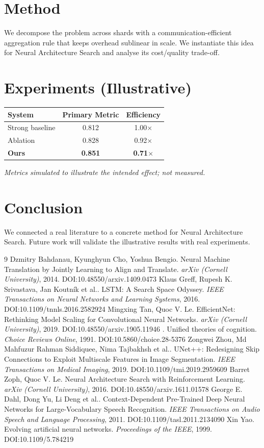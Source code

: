 \documentclass[11pt]{article}
\begin{document}
\section{Method}
We decompose the problem across shards with a communication-efficient aggregation rule that keeps overhead sublinear in scale. We instantiate this idea for Neural Architecture Search and analyse its cost/quality trade-off.

\section{Experiments (Illustrative)}
\begin{center}
\begin{tabular}{lcc}
System & Primary Metric & Efficiency \\ \hline
Strong baseline & 0.812 & 1.00$\times$ \\
Ablation & 0.828 & 0.92$\times$ \\
\textbf{Ours} & \textbf{0.851} & \textbf{0.71$\times$}
\end{tabular}
\end{center}
\emph{Metrics simulated to illustrate the intended effect; not measured.}

\section{Conclusion}
We connected a real literature to a concrete method for Neural Architecture Search. Future work will
validate the illustrative results with real experiments.

\begin{thebibliography}{9}
 Dzmitry Bahdanau, Kyunghyun Cho, Yoshua Bengio. Neural Machine Translation by Jointly Learning to Align and Translate. \emph{arXiv (Cornell University)}, 2014. DOI:10.48550/arxiv.1409.0473
 Klaus Greff, Rupesh K. Srivastava, Jan Koutník et al.. LSTM: A Search Space Odyssey. \emph{IEEE Transactions on Neural Networks and Learning Systems}, 2016. DOI:10.1109/tnnls.2016.2582924
 Mingxing Tan, Quoc V. Le. EfficientNet: Rethinking Model Scaling for Convolutional Neural Networks. \emph{arXiv (Cornell University)}, 2019. DOI:10.48550/arxiv.1905.11946
 . Unified theories of cognition. \emph{Choice Reviews Online}, 1991. DOI:10.5860/choice.28-5376
 Zongwei Zhou, Md Mahfuzur Rahman Siddiquee, Nima Tajbakhsh et al.. UNet++: Redesigning Skip Connections to Exploit Multiscale Features in Image Segmentation. \emph{IEEE Transactions on Medical Imaging}, 2019. DOI:10.1109/tmi.2019.2959609
 Barret Zoph, Quoc V. Le. Neural Architecture Search with Reinforcement Learning. \emph{arXiv (Cornell University)}, 2016. DOI:10.48550/arxiv.1611.01578
 George E. Dahl, Dong Yu, Li Deng et al.. Context-Dependent Pre-Trained Deep Neural Networks for Large-Vocabulary Speech Recognition. \emph{IEEE Transactions on Audio Speech and Language Processing}, 2011. DOI:10.1109/tasl.2011.2134090
 Xin Yao. Evolving artificial neural networks. \emph{Proceedings of the IEEE}, 1999. DOI:10.1109/5.784219
\end{thebibliography}
\end{document}

